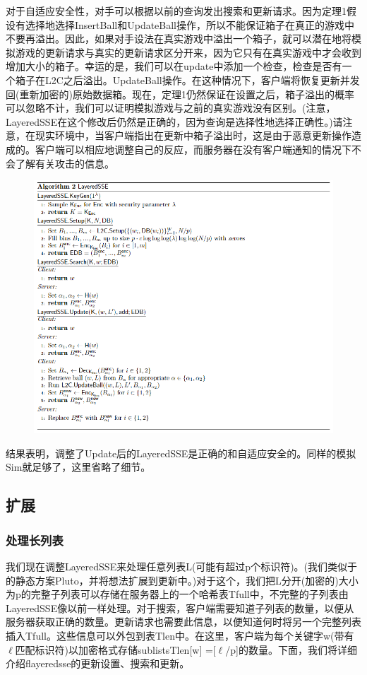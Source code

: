 \documentclass[UTF8]{article}
\begin{document}
对于自适应安全性，对手可以根据以前的查询发出搜索和更新请求。因为定理1假设有选择地选择InsertBall和UpdateBall操作，所以不能保证箱子在真正的游戏中不要再溢出。因此，如果对手设法在真实游戏中溢出一个箱子，就可以潜在地将模拟游戏的更新请求与真实的更新请求区分开来，因为它只有在真实游戏中才会收到增加大小的箱子。幸运的是，我们可以在update中添加一个检查，检查是否有一个箱子在L2C之后溢出。UpdateBall操作。在这种情况下，客户端将恢复更新并发回(重新加密的)原始数据箱。现在，定理1仍然保证在设置之后，箱子溢出的概率可以忽略不计，我们可以证明模拟游戏与之前的真实游戏没有区别。(注意，LayeredSSE在这个修改后仍然是正确的，因为查询是选择性地选择正确性。)请注意，在现实环境中，当客户端指出在更新中箱子溢出时，这是由于恶意更新操作造成的。客户端可以相应地调整自己的反应，而服务器在没有客户端通知的情况下不会了解有关攻击的信息。
\begin{figure}[ht]
  \centering
  \includegraphics[scale=0.5]{table4.png}
  \label{table4}
\end{figure}
结果表明，调整了Update后的LayeredSSE是正确的和自适应安全的。同样的模拟Sim就足够了，这里省略了细节。

\subsection{扩展}
\subsubsection{处理长列表}
我们现在调整LayeredSSE来处理任意列表L(可能有超过p个标识符)。(我们类似于\cite{AngleBossuat2021SSEAS}的静态方案Pluto，并将想法扩展到更新中。)对于这个，我们把L分开(加密的)大小为p的完整子列表可以存储在服务器上的一个哈希表Tfull中，不完整的子列表由LayeredSSE像以前一样处理。对于搜索，客户端需要知道子列表的数量，以便从服务器获取正确的数量。更新请求也需要此信息，以便知道何时将另一个完整列表插入Tfull。这些信息可以外包到表Tlen中。在这里，客户端为每个关键字w(带有$\ell$匹配标识符)以加密格式存储sublistsTlen[w] =[$\ell$/p]的数量。下面，我们将详细介绍flayeredsse的更新设置、搜索和更新。
\end{document}
